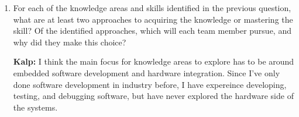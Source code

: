 \begin{enumerate}
  \item For each of the knowledge areas and skills identified in the previous
  question, what are at least two approaches to acquiring the knowledge or
  mastering the skill?  Of the identified approaches, which will each team
  member pursue, and why did they make this choice?

  \textbf{Kalp:} I think the main focus for knowledge areas to explore has to be
  around embedded software development and hardware integration. Since I've only
  done software development in industry before, I have expereince developing, 
  testing, and debugging software, but have never explored the hardware side of
  the systems. 

\end{enumerate}
